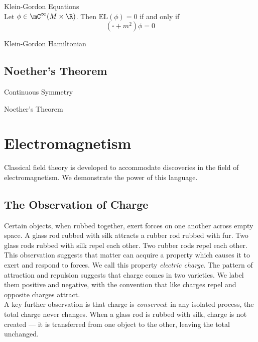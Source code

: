\documentclass[a4paper]{article}
\begin{document}
\begin{thm}{Klein-Gordon Equations}{}\\
Let $\phi\in\mC^\infty(M\times\R)$. Then $\text{EL}(\phi)=0$ if and only if $$(\square+m^2)\phi=0$$
\end{thm}

\begin{prp}{Klein-Gordon Hamiltonian}{}
\end{prp}

\subsection{Noether's Theorem}
\begin{defn}{Continuous Symmetry}{}
\end{defn}

\begin{thm}{Noether's Theorem}{}
\end{thm}

\pagebreak
\section{Electromagnetism}
Classical field theory is developed to accommodate discoveries in the field of electromagnetism. We demonstrate the power of this language. 

\subsection*{The Observation of Charge}
Certain objects, when rubbed together, exert forces on one another across empty space. A glass rod rubbed with silk attracts a rubber rod rubbed with fur. Two glass rods rubbed with silk repel each other. Two rubber rods repel each other. \\

This observation suggests that matter can acquire a property which causes it to exert and respond to forces. We call this property \textit{electric charge}. The pattern of attraction and repulsion suggests that charge comes in two varieties. We label them positive and negative, with the convention that like charges repel and opposite charges attract. \\

A key further observation is that charge is \textit{conserved}: in any isolated process, the total charge never changes. When a glass rod is rubbed with silk, charge is not created --- it is transferred from one object to the other, leaving the total unchanged. 
\end{document}
